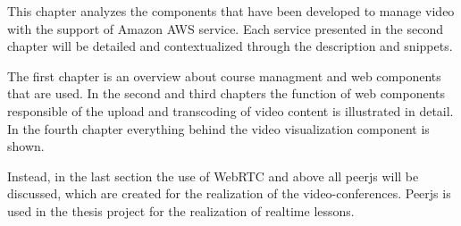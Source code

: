 This chapter analyzes the components that have been developed to manage video with the support of Amazon AWS service.
Each service presented in the second chapter will be detailed and contextualized through the description and snippets. 

The first chapter is an overview about course managment and web components that are used.
In the second and third chapters the function of web components responsible of the upload and transcoding of video content is illustrated in detail.
In the fourth chapter everything behind the video visualization component is shown. 

Instead, in the last section the use of WebRTC and above all peerjs will be discussed, which are created for the realization of the video-conferences. Peerjs is used in the thesis project for the realization of realtime lessons.